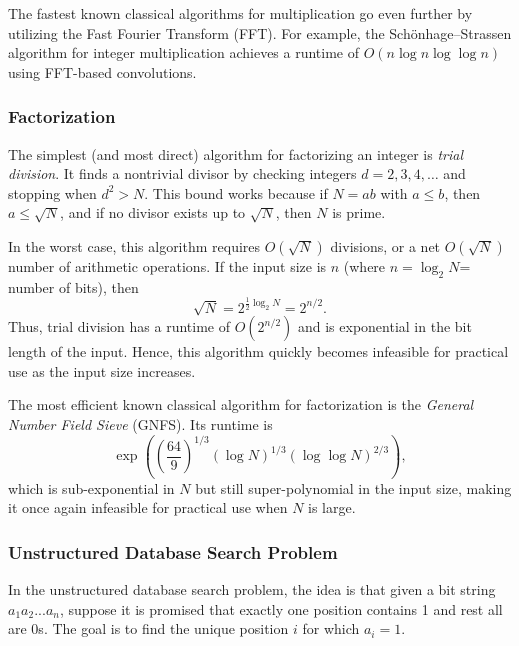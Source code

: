The fastest known classical algorithms for multiplication go even further by utilizing the Fast Fourier Transform (FFT). For example, the Schönhage--Strassen algorithm for integer multiplication achieves a runtime of \(O(n \log n \log \log n)\) using FFT-based convolutions.

\subsubsection{Factorization}
The simplest (and most direct) algorithm for factorizing an integer is \emph{trial division}. It finds a nontrivial divisor by checking integers $d = 2, 3, 4, \ldots$ and stopping when $d^2 > N$. This bound works because if $N = ab$ with $a \le b$, then $a \le \sqrt{N}$, and if no divisor exists up to $\sqrt{N}$, then $N$ is prime.

In the worst case, this algorithm requires $O(\sqrt{N})$ divisions, or a net $O(\sqrt{N})$ number of arithmetic operations. If the input size is $n$ (where $n = \log_2 N$= number of bits), then
\[
\sqrt{N} = 2^{\frac{1}{2} \log_2 N} = 2^{n/2}.
\]
Thus, trial division has a runtime of $O(2^{n/2})$ and is exponential in the bit length of the input. Hence, this algorithm quickly becomes infeasible for practical use as the input size increases.

The most efficient known classical algorithm for factorization is the \emph{General Number Field Sieve} (GNFS). Its runtime is
\[
\exp\!\left( \left( \frac{64}{9} \right)^{1/3} (\log N)^{1/3} (\log \log N)^{2/3} \right),
\]
which is sub-exponential in $N$ but still super-polynomial in the input size, making it once again infeasible for practical use when $N$ is large.

\medskip
\noindent
{}
\medskip

\subsubsection{Unstructured Database Search Problem}
In the unstructured database search problem, the idea is that given a bit string $a_1a_2...a_n$, suppose it is promised that exactly one position contains 1 and rest all are 0s. The goal is to find the unique position \( i \) for which \( a_i = 1 \).

